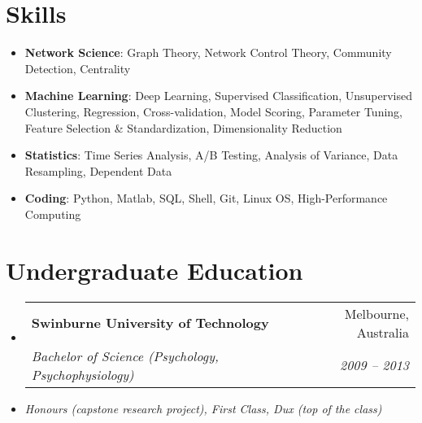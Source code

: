 \documentclass[letterpaper,10pt]{article}
\makeatletter
\newcommand{\resumeSubheading}[4]{
  \vspace{-1pt}\item
    \begin{tabular*}{0.97\textwidth}[t]{l@{\extracolsep{\fill}}r}
      \textbf{#1} & #2 \\
      \textit{\small#3} & \textit{\small #4} \\
    \end{tabular*}\vspace{-5pt}
}
\newcommand{\resumeSubHeadingListStart}{\begin{itemize}[leftmargin=*]}
\newcommand{\resumeSubHeadingListEnd}{\end{itemize}}
\makeatother
\begin{document}
\section{Skills}
 \resumeSubHeadingListStart
   \item{
    \textbf{Network Science}{: Graph Theory, Network Control Theory, Community Detection, Centrality}
    }
   \item{
    \textbf{Machine Learning}{: Deep Learning, Supervised Classification, Unsupervised Clustering, Regression, Cross-validation, Model Scoring, Parameter Tuning, Feature Selection \& Standardization, Dimensionality Reduction}
    }
   \item{
    \textbf{Statistics}{: Time Series Analysis, A/B Testing, Analysis of Variance, Data Resampling, Dependent Data}
    }
   \item{
    \textbf{Coding}{: Python, Matlab, SQL, Shell, Git, Linux OS, High-Performance Computing}
    }
 \resumeSubHeadingListEnd

\section{Undergraduate Education}
  \resumeSubHeadingListStart
    \resumeSubheading
      {Swinburne University of Technology}{Melbourne, Australia}
      {Bachelor of Science (Psychology, Psychophysiology)}{2009 -- 2013}
      \item[] \textit{Honours (capstone research project), First Class, Dux (top of the class)}
  \resumeSubHeadingListEnd
\end{document}
